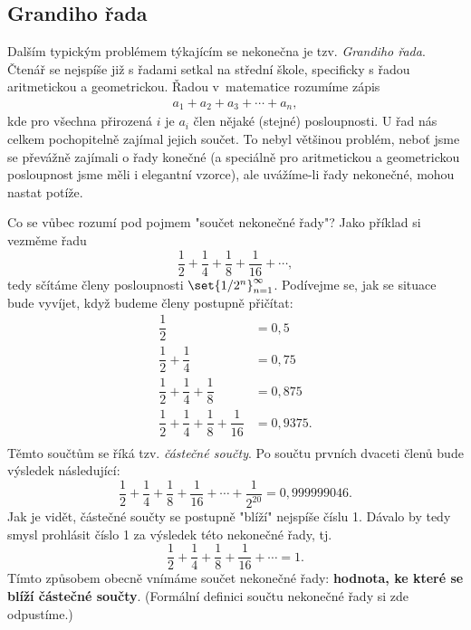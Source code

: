 \subsection{Grandiho řada}
Dalším typickým problémem týkajícím se nekonečna je tzv. \emph{Grandiho řada}. Čtenář se nejspíše již s řadami setkal na střední škole, specificky s řadou aritmetickou a geometrickou. Řadou v~matematice rozumíme zápis
\begin{align*}
a_1+a_2+a_3+\cdots+a_n,
\end{align*}
kde pro všechna přirozená $i$ je $a_i$ člen nějaké (stejné) posloupnosti. U řad nás celkem pochopitelně zajímal jejich součet. To nebyl většinou problém, neboť jsme se převážně zajímali o řady konečné (a speciálně pro aritmetickou a geometrickou posloupnost jsme měli i elegantní vzorce), ale uvážíme-li řady nekonečné, mohou nastat potíže.\par
Co se vůbec rozumí pod pojmem "součet nekonečné řady"? Jako příklad si vezměme řadu
\begin{equation*}
	\dfrac{1}{2}+\dfrac{1}{4}+\dfrac{1}{8}+\dfrac{1}{16}+\cdots,
\end{equation*}
tedy sčítáme členy posloupnosti $\set{1/2^n}_{n=1}^{\infty}$. Podívejme se, jak se situace bude vyvíjet, když budeme členy postupně přičítat:
\begin{align*}
	\dfrac{1}{2}&=0{,}5\\
	\dfrac{1}{2}+\dfrac{1}{4}&=0{,}75\\
	\dfrac{1}{2}+\dfrac{1}{4}+\dfrac{1}{8}&=0{,}875\\
	\dfrac{1}{2}+\dfrac{1}{4}+\dfrac{1}{8}+\dfrac{1}{16}&=0{,}9375.\\
\end{align*}
Těmto součtům se říká tzv. \emph{částečné součty}. Po součtu prvních dvaceti členů bude výsledek následující:
\begin{equation*}
	\dfrac{1}{2}+\dfrac{1}{4}+\dfrac{1}{8}+\dfrac{1}{16}+\cdots+\dfrac{1}{2^{20}}=0{,}999999046.
\end{equation*}
Jak je vidět, částečné součty se postupně "blíží" nejspíše číslu 1. Dávalo by tedy smysl prohlásit číslo 1 za výsledek této nekonečné řady, tj.
\begin{equation*}
	\dfrac{1}{2}+\dfrac{1}{4}+\dfrac{1}{8}+\dfrac{1}{16}+\cdots=1.
\end{equation*}
Tímto způsobem obecně vnímáme součet nekonečné řady: \textbf{hodnota, ke které se blíží částečné součty}. (Formální definici součtu nekonečné řady si zde odpustíme.)
\medskip

